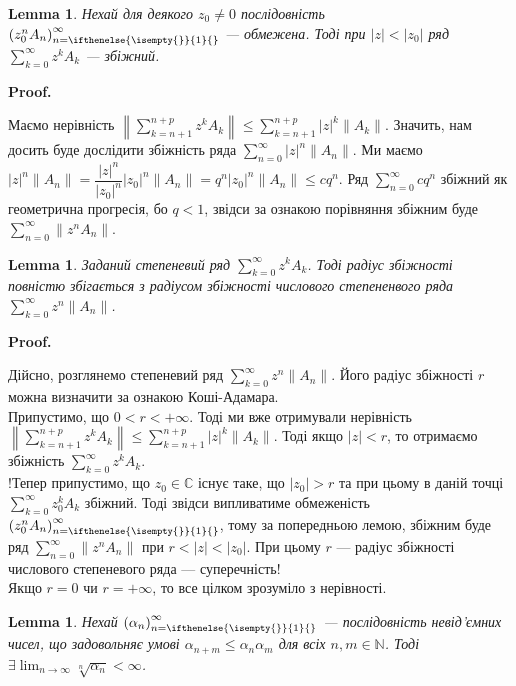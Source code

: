\documentclass[a4paper, 10pt]{article}
\makeatletter
\theoremstyle{theoremdd}
\theoremstyle{theoremdd}
\theoremstyle{theoremdd}
\theoremstyle{theoremdd}
\theoremstyle{theoremdd}
\theoremstyle{theoremdd}
\theoremstyle{theoremdd}
\newtheorem{lemma}[theorem]{Lemma}
\theoremstyle{theoremdd}
\newcommand{\sequence}[2][]{\left({#2}\right)_{n=\ifthenelse{\isempty{#1}}{1}{#1}}^{\infty}}
\renewenvironment{proof}[1][Proof.\\]{\par
\pushQED{\hfill \qed}%
\normalfont \topsep6\p@\@plus6\p@\relax
\trivlist
\item\relax
{\bfseries
#1\@addpunct{.}}\hspace\labelsep\ignorespaces
}{%
\popQED\endtrivlist\@endpefalse
}
\makeatother
\begin{document}
\begin{lemma}
Нехай для деякого $z_0 \neq 0$ послідовність $\sequence{z_0^n A_n}$ --- обмежена. Тоді при $|z| < |z_0|$ ряд $\displaystyle\sum_{k=0}^\infty z^k A_k$ --- збіжний.
\end{lemma}

\begin{proof}
Маємо нерівність $\displaystyle \left\| \sum_{k=n+1}^{n+p} z^k A_k \right\| \leq \sum_{k=n+1}^{n+p} |z|^k \|A_k\|$. Значить, нам досить буде дослідити збіжність ряда $\displaystyle\sum_{n=0}^\infty |z|^n \|A_n\|$. Ми маємо $|z|^n \|A_n\| = \dfrac{|z|^n}{|z_0|^n} |z_0|^n \|A_n\| = q^n |z_0|^n \|A_n\| \leq c q^n$. Ряд $\displaystyle\sum_{n=0}^\infty cq^n$ збіжний як геометрична прогресія, бо $q < 1$, звідси за ознакою порівняння збіжним буде $\displaystyle\sum_{n=0}^\infty \|z^n A_n\|$.
\end{proof}

\begin{lemma}
Заданий степеневий ряд $\displaystyle\sum_{k=0}^\infty z^k A_k$. Тоді радіус збіжності повністю збігається з радіусом збіжності числового степененвого ряда $\displaystyle\sum_{k=0}^\infty z^n \|A_n\|$.
\end{lemma}

\begin{proof}
Дійсно, розглянемо степеневий ряд $\displaystyle\sum_{k=0}^\infty z^n \|A_n\|$. Його радіус збіжності $r$ можна визначити за ознакою Коші-Адамара.\\ Припустимо, що $0 < r < +\infty$. Тоді ми вже отримували нерівність $\displaystyle\left\|\sum_{k=n+1}^{n+p} z^k A_k\right\| \leq \sum_{k=n+1}^{n+p} |z|^k \|A_k\|$. Тоді якщо $|z| < r$, то отримаємо збіжність $\displaystyle\sum_{k=0}^\infty z^k A_k$.\\
!Тепер припустимо, що $z_0 \in \mathbb{C}$ існує таке, що $|z_0| > r$ та при цьому в даній точці $\displaystyle\sum_{k=0}^\infty z_0^k A_k$ збіжний. Тоді звідси випливатиме обмеженість $\sequence{z_0^n A_n}$, тому за попередньою лемою, збіжним буде  ряд $\displaystyle\sum_{n=0}^\infty \|z^n A_n\|$ при $r < |z| < |z_0|$. При цьому $r$ --- радіус збіжності числового степеневого ряда --- суперечність!
\bigskip \\
Якщо $r = 0$ чи $r = +\infty$, то все цілком зрозуміло з нерівності.
\end{proof}

\begin{lemma}
Нехай $\sequence{\alpha_n}$ --- послідовність невід'ємних чисел, що задовольняє умові $\alpha_{n+m} \leq \alpha_n \alpha_m$ для всіх $n,m \in \mathbb{N}$. Тоді $\exists \displaystyle\lim_{n \to \infty} \sqrt[n]{\alpha_n} < \infty$.
\end{lemma}
\end{document}
